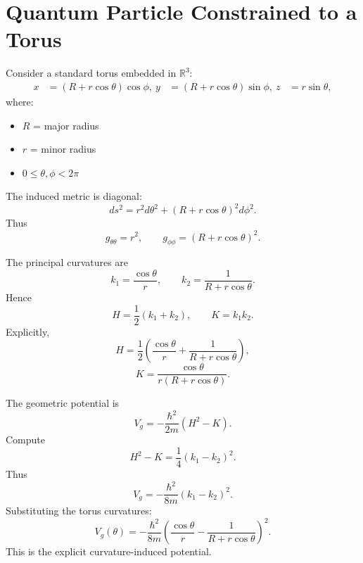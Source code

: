 \section{Quantum Particle Constrained to a Torus}

Consider a standard torus embedded in $\mathbb{R}^3$:
\begin{equation}
\begin{aligned}
x &= (R + r \cos\theta) \cos\phi, \
y &= (R + r \cos\theta) \sin\phi, \
z &= r \sin\theta,
\end{aligned}
\end{equation}
where:
\begin{itemize}
\item $R$ = major radius
\item $r$ = minor radius
\item $0 \le \theta, \phi < 2\pi$
\end{itemize}

The induced metric is diagonal:
\begin{equation}
ds^2 = r^2 d\theta^2 + (R + r \cos\theta)^2 d\phi^2.
\end{equation}
Thus
\begin{equation}
g_{\theta\theta} = r^2, \qquad g_{\phi\phi} = (R + r\cos\theta)^2.
\end{equation}

The principal curvatures are
\begin{equation}
k_1 = \frac{\cos\theta}{r},
\qquad
k_2 = \frac{1}{R + r \cos\theta}.
\end{equation}
Hence
\begin{equation}
H = \frac{1}{2}(k_1 + k_2),
\qquad
K = k_1 k_2.
\end{equation}
Explicitly,
\begin{equation}
H = \frac{1}{2}\left(\frac{\cos\theta}{r} + \frac{1}{R + r \cos\theta}\right),
\end{equation}
\begin{equation}
K = \frac{\cos\theta}{r(R + r \cos\theta)}.
\end{equation}

The geometric potential is
\begin{equation}
V_g = -\frac{\hbar^2}{2m}(H^2 - K).
\end{equation}
Compute
\begin{equation}
H^2 - K = \frac{1}{4}(k_1 - k_2)^2.
\end{equation}
Thus
\begin{equation}
V_g = -\frac{\hbar^2}{8m}(k_1 - k_2)^2.
\end{equation}
Substituting the torus curvatures:
\begin{equation}
V_g(\theta) = -\frac{\hbar^2}{8m}
\left(
\frac{\cos\theta}{r} - \frac{1}{R + r \cos\theta}
\right)^2.
\end{equation}
This is the explicit curvature-induced potential.

